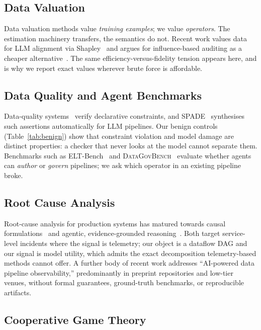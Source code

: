 \documentclass[conference]{IEEEtran}
\begin{document}
\subsection{Data Valuation}

Data valuation methods value \emph{training examples}; we value
\emph{operators}. The estimation machinery transfers, the semantics do not.
Recent work values data for LLM alignment via
Shapley~\cite{llmvaluation} and argues for influence-based auditing as a cheaper
alternative~\cite{beyondshapley}. The same efficiency-versus-fidelity tension
appears here, and is why we report exact values wherever brute force is
affordable.

\subsection{Data Quality and Agent Benchmarks}

Data-quality systems~\cite{deequ} verify declarative constraints, and
\textsc{SPADE}~\cite{spade} synthesises such assertions automatically for LLM
pipelines. Our benign controls (Table~\ref{tab:benign}) show that constraint
violation and model damage are distinct properties: a checker that never looks at
the model cannot separate them. Benchmarks such as
ELT-Bench~\cite{eltbench} and \textsc{DataGovBench}~\cite{datagovbench} evaluate
whether agents can \emph{author} or \emph{govern} pipelines; we ask which
operator in an existing pipeline broke.

\subsection{Root Cause Analysis}

Root-cause analysis for production systems has matured towards causal
formulations~\cite{causalrca} and agentic, evidence-grounded
reasoning~\cite{agenticrca}. Both target service-level incidents where the signal
is telemetry; our object is a dataflow DAG and our signal is model utility, which
admits the exact decomposition telemetry-based methods cannot offer. A further
body of recent work addresses ``AI-powered data pipeline observability,''
predominantly in preprint repositories and low-tier venues, without formal
guarantees, ground-truth benchmarks, or reproducible artifacts.

\subsection{Cooperative Game Theory}
\end{document}
